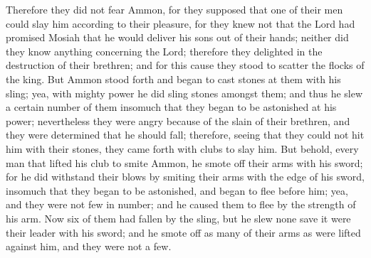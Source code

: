 Therefore they did not fear Ammon, for they supposed that one of their men could slay him according to their pleasure, for they knew not that the Lord had promised Mosiah that he would deliver his sons out of their hands; neither did they know anything concerning the Lord; therefore they delighted in the destruction of their brethren; and for this cause they stood to scatter the flocks of the king.
\bverse \iffalse But Ammon stood forth and began to cast stones at them with his sling; yea, with mighty power he did sling stones amongst them; and thus he slew a certain number of them insomuch that they began to be astonished at his power; nevertheless they were angry because of the slain of their brethren, and they were determined that he should fall; therefore, seeing that they could not hit him with their stones, they came forth with clubs to slay him. \fi
But Ammon stood forth and began to cast stones at them with his sling; yea, with mighty power he did sling stones amongst them; and thus he slew a certain number of them insomuch that they began to be astonished at his power; nevertheless they were angry because of the slain of their brethren, and they were determined that he should fall; therefore, seeing that they could not hit him with their stones, they came forth with clubs to slay him.
\bverse \iffalse But behold, every man that lifted his club to smite Ammon, he smote off their arms with his sword; for he did withstand their blows by smiting their arms with the edge of his sword, insomuch that they began to be astonished, and began to flee before him; yea, and they were not few in number; and he caused them to flee by the strength of his arm. \fi
But behold, every man that lifted his club to smite Ammon, he smote off their arms with his sword; for he did withstand their blows by smiting their arms with the edge of his sword, insomuch that they began to be astonished, and began to flee before him; yea, and they were not few in number; and he caused them to flee by the strength of his arm.
\bverse \iffalse Now six of them had fallen by the sling, but he slew none save it were their leader with his sword; and he smote off as many of their arms as were lifted against him, and they were not a few. \fi
Now six of them had fallen by the sling, but he slew none save it were their leader with his sword; and he smote off as many of their arms as were lifted against him, and they were not a few.
\bverse \iffalse And when he had driven them afar off, he returned and they watered their flocks and returned them to the pasture of the king, and then went in unto the king, bearing the arms which had been smitten off by the sword of Ammon, of those who sought to slay him; and they were carried in unto the king for a testimony of the things which they had done. \fi
